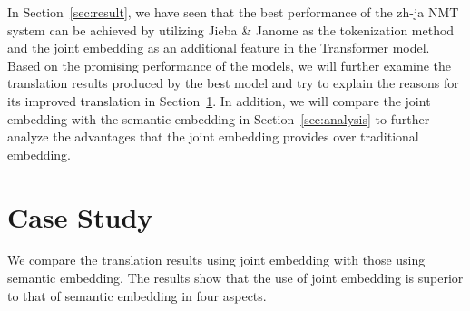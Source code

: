 \hspace{24pt}

In Section~\ref{sec:result}, we have seen that the best performance of the zh-ja NMT system can be achieved by utilizing Jieba \& Janome as the tokenization method and the joint embedding as an additional feature in the Transformer model. Based on the promising performance of the models, we will further examine the translation results produced by the best model and try to explain the reasons for its improved translation in Section~\ref{sec:case_study}. In addition, we will compare the joint embedding with the semantic embedding in Section~\ref{sec:analysis} to further analyze the advantages that the joint embedding provides over traditional embedding.

\section{Case Study} \label{sec:case_study}

We compare the translation results using joint embedding with those using semantic embedding. The results show that the use of joint embedding is superior to that of semantic embedding in four aspects.

